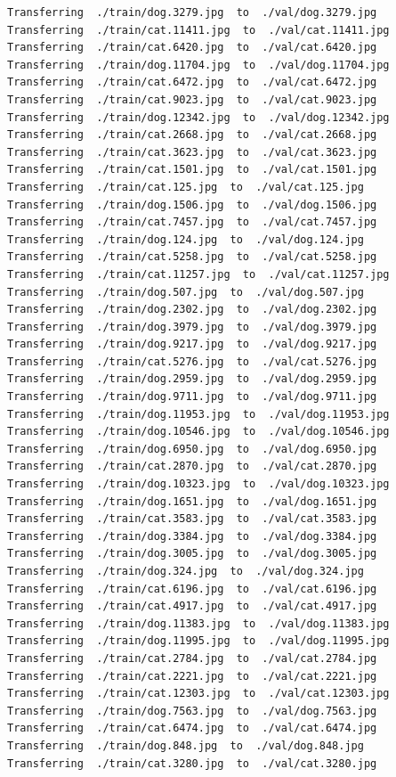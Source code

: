 \documentclass[]{book}
\theoremstyle{definition}
\theoremstyle{definition}
\theoremstyle{definition}
\theoremstyle{remark}
\begin{document}
\begin{verbatim}
Transferring  ./train/dog.3279.jpg  to  ./val/dog.3279.jpg
Transferring  ./train/cat.11411.jpg  to  ./val/cat.11411.jpg
Transferring  ./train/cat.6420.jpg  to  ./val/cat.6420.jpg
Transferring  ./train/dog.11704.jpg  to  ./val/dog.11704.jpg
Transferring  ./train/cat.6472.jpg  to  ./val/cat.6472.jpg
Transferring  ./train/cat.9023.jpg  to  ./val/cat.9023.jpg
Transferring  ./train/dog.12342.jpg  to  ./val/dog.12342.jpg
Transferring  ./train/cat.2668.jpg  to  ./val/cat.2668.jpg
Transferring  ./train/cat.3623.jpg  to  ./val/cat.3623.jpg
Transferring  ./train/cat.1501.jpg  to  ./val/cat.1501.jpg
Transferring  ./train/cat.125.jpg  to  ./val/cat.125.jpg
Transferring  ./train/dog.1506.jpg  to  ./val/dog.1506.jpg
Transferring  ./train/cat.7457.jpg  to  ./val/cat.7457.jpg
Transferring  ./train/dog.124.jpg  to  ./val/dog.124.jpg
Transferring  ./train/cat.5258.jpg  to  ./val/cat.5258.jpg
Transferring  ./train/cat.11257.jpg  to  ./val/cat.11257.jpg
Transferring  ./train/dog.507.jpg  to  ./val/dog.507.jpg
Transferring  ./train/dog.2302.jpg  to  ./val/dog.2302.jpg
Transferring  ./train/dog.3979.jpg  to  ./val/dog.3979.jpg
Transferring  ./train/dog.9217.jpg  to  ./val/dog.9217.jpg
Transferring  ./train/cat.5276.jpg  to  ./val/cat.5276.jpg
Transferring  ./train/dog.2959.jpg  to  ./val/dog.2959.jpg
Transferring  ./train/dog.9711.jpg  to  ./val/dog.9711.jpg
Transferring  ./train/dog.11953.jpg  to  ./val/dog.11953.jpg
Transferring  ./train/dog.10546.jpg  to  ./val/dog.10546.jpg
Transferring  ./train/dog.6950.jpg  to  ./val/dog.6950.jpg
Transferring  ./train/cat.2870.jpg  to  ./val/cat.2870.jpg
Transferring  ./train/dog.10323.jpg  to  ./val/dog.10323.jpg
Transferring  ./train/dog.1651.jpg  to  ./val/dog.1651.jpg
Transferring  ./train/cat.3583.jpg  to  ./val/cat.3583.jpg
Transferring  ./train/dog.3384.jpg  to  ./val/dog.3384.jpg
Transferring  ./train/dog.3005.jpg  to  ./val/dog.3005.jpg
Transferring  ./train/dog.324.jpg  to  ./val/dog.324.jpg
Transferring  ./train/cat.6196.jpg  to  ./val/cat.6196.jpg
Transferring  ./train/cat.4917.jpg  to  ./val/cat.4917.jpg
Transferring  ./train/dog.11383.jpg  to  ./val/dog.11383.jpg
Transferring  ./train/dog.11995.jpg  to  ./val/dog.11995.jpg
Transferring  ./train/cat.2784.jpg  to  ./val/cat.2784.jpg
Transferring  ./train/cat.2221.jpg  to  ./val/cat.2221.jpg
Transferring  ./train/cat.12303.jpg  to  ./val/cat.12303.jpg
Transferring  ./train/dog.7563.jpg  to  ./val/dog.7563.jpg
Transferring  ./train/cat.6474.jpg  to  ./val/cat.6474.jpg
Transferring  ./train/dog.848.jpg  to  ./val/dog.848.jpg
Transferring  ./train/cat.3280.jpg  to  ./val/cat.3280.jpg

\end{verbatim}
\end{document}
